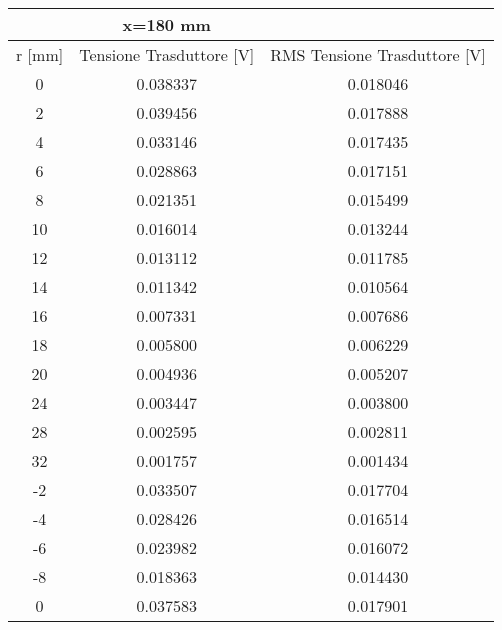 \begin{table}[ht!]
\begin{tabular}{|c|c|c|}
\end{tabular}
\vspace{0.5cm}
\centering
\begin{tabular}{|c|c|c|}
\hline
           & x=180 mm                     &                                  \\ \hline
r {[}mm{]} & Tensione Trasduttore {[}V{]} & RMS Tensione Trasduttore {[}V{]} \\ \hline
0          & 0.038337                     & 0.018046                         \\ \hline
2          & 0.039456                     & 0.017888                         \\ \hline
4          & 0.033146                     & 0.017435                         \\ \hline
6          & 0.028863                     & 0.017151                         \\ \hline
8          & 0.021351                     & 0.015499                         \\ \hline
10         & 0.016014                     & 0.013244                         \\ \hline
12         & 0.013112                     & 0.011785                         \\ \hline
14         & 0.011342                     & 0.010564                         \\ \hline
16         & 0.007331                     & 0.007686                         \\ \hline
18         & 0.005800                     & 0.006229                         \\ \hline
20         & 0.004936                     & 0.005207                         \\ \hline
24         & 0.003447                     & 0.003800                         \\ \hline
28         & 0.002595                     & 0.002811                         \\ \hline
32         & 0.001757                     & 0.001434                         \\ \hline
-2         & 0.033507                     & 0.017704                         \\ \hline
-4         & 0.028426                     & 0.016514                         \\ \hline
-6         & 0.023982                     & 0.016072                         \\ \hline
-8         & 0.018363                     & 0.014430                         \\ \hline
0          & 0.037583                     & 0.017901                         \\ \hline
\end{tabular}
\end{table}

